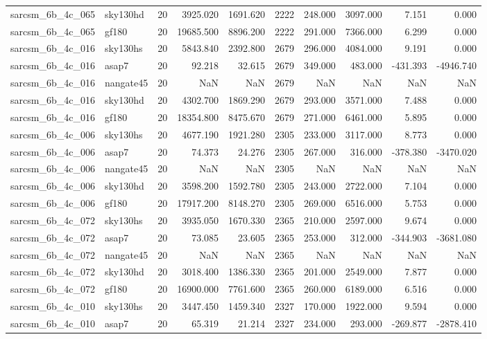 \documentclass{article}
\begin{document}
\begin{longtable}{llrrrrrrrr}
sarcsm\_6b\_4c\_065 & sky130hd & 20 & 3925.020 & 1691.620 & 2222 & 248.000 & 3097.000 & 7.151 & 0.000 \\
sarcsm\_6b\_4c\_065 & gf180 & 20 & 19685.500 & 8896.200 & 2222 & 291.000 & 7366.000 & 6.299 & 0.000 \\
sarcsm\_6b\_4c\_016 & sky130hs & 20 & 5843.840 & 2392.800 & 2679 & 296.000 & 4084.000 & 9.191 & 0.000 \\
sarcsm\_6b\_4c\_016 & asap7 & 20 & 92.218 & 32.615 & 2679 & 349.000 & 483.000 & -431.393 & -4946.740 \\
sarcsm\_6b\_4c\_016 & nangate45 & 20 & NaN & NaN & 2679 & NaN & NaN & NaN & NaN \\
sarcsm\_6b\_4c\_016 & sky130hd & 20 & 4302.700 & 1869.290 & 2679 & 293.000 & 3571.000 & 7.488 & 0.000 \\
sarcsm\_6b\_4c\_016 & gf180 & 20 & 18354.800 & 8475.670 & 2679 & 271.000 & 6461.000 & 5.895 & 0.000 \\
sarcsm\_6b\_4c\_006 & sky130hs & 20 & 4677.190 & 1921.280 & 2305 & 233.000 & 3117.000 & 8.773 & 0.000 \\
sarcsm\_6b\_4c\_006 & asap7 & 20 & 74.373 & 24.276 & 2305 & 267.000 & 316.000 & -378.380 & -3470.020 \\
sarcsm\_6b\_4c\_006 & nangate45 & 20 & NaN & NaN & 2305 & NaN & NaN & NaN & NaN \\
sarcsm\_6b\_4c\_006 & sky130hd & 20 & 3598.200 & 1592.780 & 2305 & 243.000 & 2722.000 & 7.104 & 0.000 \\
sarcsm\_6b\_4c\_006 & gf180 & 20 & 17917.200 & 8148.270 & 2305 & 269.000 & 6516.000 & 5.753 & 0.000 \\
sarcsm\_6b\_4c\_072 & sky130hs & 20 & 3935.050 & 1670.330 & 2365 & 210.000 & 2597.000 & 9.674 & 0.000 \\
sarcsm\_6b\_4c\_072 & asap7 & 20 & 73.085 & 23.605 & 2365 & 253.000 & 312.000 & -344.903 & -3681.080 \\
sarcsm\_6b\_4c\_072 & nangate45 & 20 & NaN & NaN & 2365 & NaN & NaN & NaN & NaN \\
sarcsm\_6b\_4c\_072 & sky130hd & 20 & 3018.400 & 1386.330 & 2365 & 201.000 & 2549.000 & 7.877 & 0.000 \\
sarcsm\_6b\_4c\_072 & gf180 & 20 & 16900.000 & 7761.600 & 2365 & 260.000 & 6189.000 & 6.516 & 0.000 \\
sarcsm\_6b\_4c\_010 & sky130hs & 20 & 3447.450 & 1459.340 & 2327 & 170.000 & 1922.000 & 9.594 & 0.000 \\
sarcsm\_6b\_4c\_010 & asap7 & 20 & 65.319 & 21.214 & 2327 & 234.000 & 293.000 & -269.877 & -2878.410 \\

\end{longtable}
\end{document}
